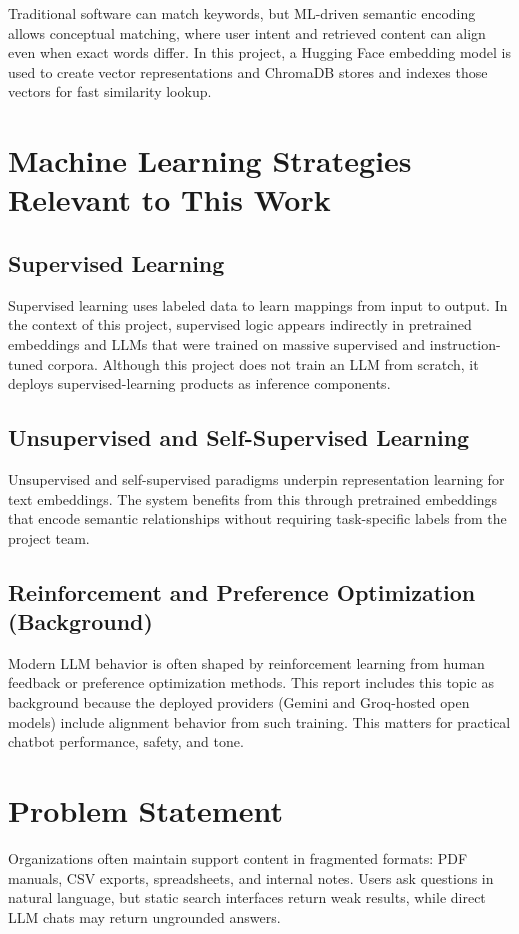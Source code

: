 \documentclass[12pt,letterpaper]{report}
\begin{document}
Traditional software can match keywords, but ML-driven semantic encoding allows conceptual matching, where user intent and retrieved content can align even when exact words differ. In this project, a Hugging Face embedding model is used to create vector representations and ChromaDB stores and indexes those vectors for fast similarity lookup.

\section{Machine Learning Strategies Relevant to This Work}
\subsection{Supervised Learning}
Supervised learning uses labeled data to learn mappings from input to output. In the context of this project, supervised logic appears indirectly in pretrained embeddings and LLMs that were trained on massive supervised and instruction-tuned corpora. Although this project does not train an LLM from scratch, it deploys supervised-learning products as inference components.

\subsection{Unsupervised and Self-Supervised Learning}
Unsupervised and self-supervised paradigms underpin representation learning for text embeddings. The system benefits from this through pretrained embeddings that encode semantic relationships without requiring task-specific labels from the project team.

\subsection{Reinforcement and Preference Optimization (Background)}
Modern LLM behavior is often shaped by reinforcement learning from human feedback or preference optimization methods. This report includes this topic as background because the deployed providers (Gemini and Groq-hosted open models) include alignment behavior from such training. This matters for practical chatbot performance, safety, and tone.

\section{Problem Statement}
Organizations often maintain support content in fragmented formats: PDF manuals, CSV exports, spreadsheets, and internal notes. Users ask questions in natural language, but static search interfaces return weak results, while direct LLM chats may return ungrounded answers. 
\end{document}

